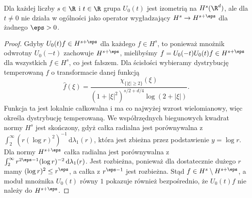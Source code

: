 \begin{stwierdzenie}
Dla każdej liczby $s\in\R$ i $t\in\R$ grupa $U_0(t)$
jest izometrią na $H^s(\R^d)$, ale dla $t\ne0$ nie
działa w ogólności jako operator wygładzający
$H^s\to H^{s+\eps}$ dla żadnego $\eps>0$.
\end{stwierdzenie}
\begin{proof}
Gdyby $U_0(t)f\in H^{s+\eps}$ dla każdego $f\in H^s$,
to ponieważ mnożnik odwrotny $U_0(-t)$ zachowuje
$H^{s+\eps}$, mielibyśmy $f=U_0(-t)U_0(t)f\in H^{s+\eps}$
dla wszystkich $f\in H^s$, co jest fałszem.
Dla ścisłości wybieramy dystrybucję temperowaną $f$
o transformacie danej funkcją
\[
 \widehat f(\xi)=
 \frac{\chi_{\{|\xi|\ge2\}}(\xi)}
 {(1+|\xi|^2)^{s/2+d/4}\log(2+|\xi|)}.
\]
Funkcja ta jest lokalnie całkowalna i ma co
najwyżej wzrost wielomianowy, więc określa
dystrybucję temperowaną. We współrzędnych
biegunowych kwadrat normy $H^s$ jest skończony,
gdyż całka radialna jest porównywalna z
$\int_2^\infty(r(\log r)^2)^{-1}\,\mathrm d\lambda_1(r)$,
która jest zbieżna przez podstawienie $y=\log r$.
Dla normy $H^{s+\eps}$ całka radialna jest
porównywalna z
$\int_2^\infty r^{2\eps-1}(\log r)^{-2}\,\mathrm d\lambda_1(r)$.
Jest rozbieżna, ponieważ dla dostatecznie dużego $r$
mamy $(\log r)^2\le r^\eps$, a całka
z $r^{\eps-1}$ jest rozbieżna.
Stąd $f\in H^s\setminus H^{s+\eps}$, a moduł
mnożnika $U_0(t)$ równy $1$ pokazuje również
bezpośrednio, że $U_0(t)f$ nie należy do
$H^{s+\eps}$.
\end{proof}

